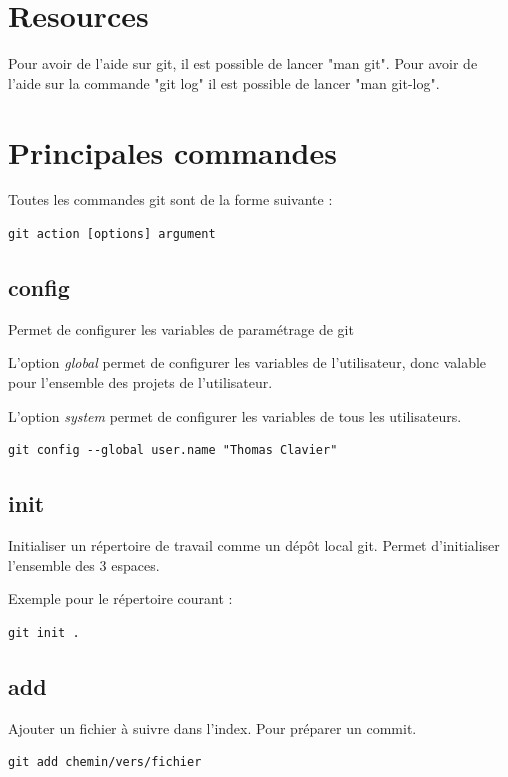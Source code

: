 \documentclass[a4paper]{article}
\begin{document}
\section*{Resources}
Pour avoir de l'aide sur git, il est possible de lancer "man git". Pour
avoir de l'aide sur la commande "git log" il est possible de lancer "man
git-log".

\section*{Principales commandes}

Toutes les commandes git sont de la forme suivante : 
\begin{verbatim}
git action [options] argument
\end{verbatim}

\subsection*{config}

Permet de configurer les variables de paramétrage de git

L'option \textit{global} permet de configurer les variables de l'utilisateur, donc valable pour l'ensemble des projets de l'utilisateur.

L'option \textit{system} permet de configurer les variables de tous les utilisateurs.

\begin{verbatim}
git config --global user.name "Thomas Clavier"
\end{verbatim}

\subsection*{init}

Initialiser un répertoire de travail comme un dépôt local git. Permet d'initialiser l'ensemble des 3 espaces.

Exemple pour le répertoire courant : 
\begin{verbatim}
git init .
\end{verbatim}

\subsection*{add}
Ajouter un fichier à suivre dans l'index. Pour préparer un commit.
\begin{verbatim}
git add chemin/vers/fichier
\end{verbatim}
\end{document}
